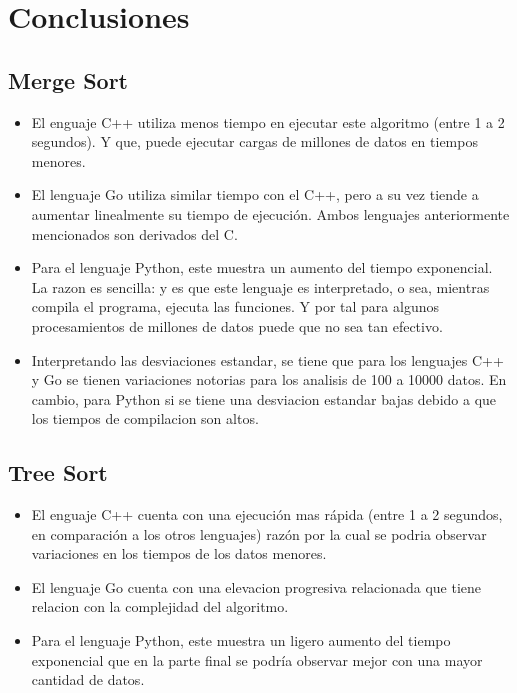 \documentclass{article}
\begin{document}
\section{Conclusiones}
    \subsection{Merge Sort} 
    \begin{itemize}
        \item El enguaje C++ utiliza menos tiempo en ejecutar este algoritmo (entre 1 a 2 segundos). Y que, puede ejecutar cargas de millones de datos en tiempos menores. 
        \item El lenguaje Go utiliza similar tiempo con el C++, pero a su vez tiende a aumentar linealmente su tiempo de ejecución. Ambos lenguajes anteriormente mencionados son derivados del C.
        \item Para el lenguaje Python, este muestra un aumento del tiempo exponencial. La razon es sencilla: y es que este lenguaje es interpretado, o sea, mientras compila el programa, ejecuta las funciones. Y por tal para algunos procesamientos de millones de datos puede que no sea tan efectivo.
        \item Interpretando las desviaciones estandar, se tiene que para los lenguajes C++ y Go se tienen variaciones notorias para los analisis de 100 a 10000 datos. En cambio, para Python si se tiene una desviacion estandar bajas debido a que los tiempos de compilacion son altos.
        
    \end{itemize}

    \subsection{Tree Sort}
	\begin{itemize}
        \item El enguaje C++ cuenta con una ejecución mas rápida (entre 1 a 2 segundos, en comparación a los otros lenguajes) razón por la cual se podria observar variaciones en los tiempos de los datos menores.
        \item El lenguaje Go cuenta con una elevacion progresiva relacionada que tiene relacion con la complejidad del algoritmo.
        \item Para el lenguaje Python, este muestra un ligero aumento del tiempo exponencial que en la parte final se podría observar mejor con una mayor cantidad de datos.        
    \end{itemize}
\end{document}
